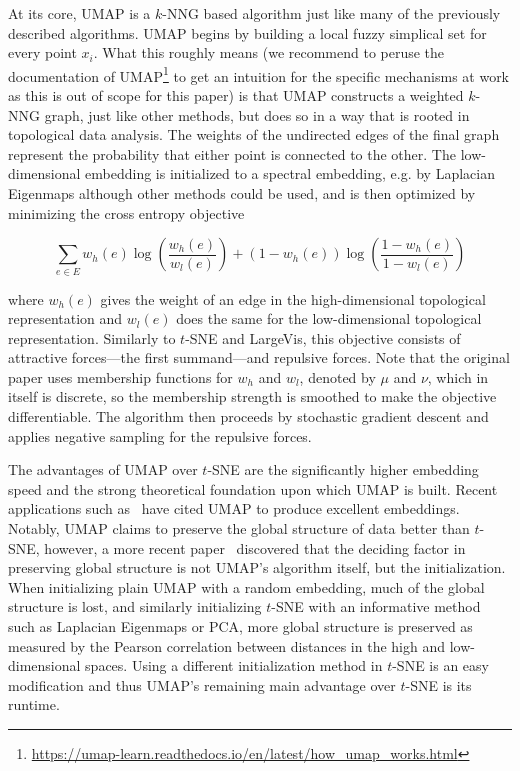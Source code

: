 At its core, UMAP is a $k$-NNG based algorithm just like many of the previously
described algorithms. UMAP begins by building a local fuzzy simplical set for
every point $x_i$. What this roughly means (we recommend to peruse the
documentation of
UMAP\footnote{\url{https://umap-learn.readthedocs.io/en/latest/how_umap_works.html}}
to get an intuition for the specific mechanisms at work as this is out of scope
for this paper) is that UMAP constructs a weighted $k$-NNG graph, just like
other methods, but does so in a way that is rooted in topological data
analysis. The weights of the undirected edges of the final graph represent the
probability that either point is connected to the other.  The low-dimensional
embedding is initialized to a spectral embedding, e.g. by Laplacian Eigenmaps
although other methods could be used, and is then optimized by minimizing the
cross entropy objective

\begin{equation}
    \sum_{e \in E} w_h(e) \log \left( \frac{w_h(e)}{w_l(e)} \right) + (1 - w_h(e)) \log \left( \frac{1 - w_h(e)}{1 - w_l(e)} \right)
    \label{eq:umap}
\end{equation}

where $w_h(e)$ gives the weight of an edge in the high-dimensional topological
representation and $w_l(e)$ does the same for the low-dimensional topological
representation. Similarly to $t$-SNE and LargeVis, this objective consists of
attractive forces---the first summand---and repulsive forces. Note that the
original paper uses membership functions for $w_h$ and $w_l$, denoted by $\mu$
and $\nu$, which in itself is discrete, so the membership strength is
smoothed to make the objective differentiable. The algorithm then proceeds by
stochastic gradient descent and applies negative sampling for the repulsive
forces.

The advantages of UMAP over $t$-SNE are the significantly higher embedding
speed and the strong theoretical foundation upon which UMAP is built. Recent
applications such as~\cite{umap_bio} have cited UMAP to produce excellent
embeddings. Notably, UMAP claims to preserve the global structure of data
better than $t$-SNE, however, a more recent paper~\cite{umap_rebuttal}
discovered that the deciding factor in preserving global structure is not
UMAP's algorithm itself, but the initialization. When initializing plain UMAP
with a random embedding, much of the global structure is lost, and similarly
initializing $t$-SNE with an informative method such as Laplacian Eigenmaps or
PCA, more global structure is preserved as measured by the Pearson correlation
between distances in the high and low-dimensional spaces. Using a different
initialization method in $t$-SNE is an easy modification and thus UMAP's remaining
main advantage over $t$-SNE is its runtime.


